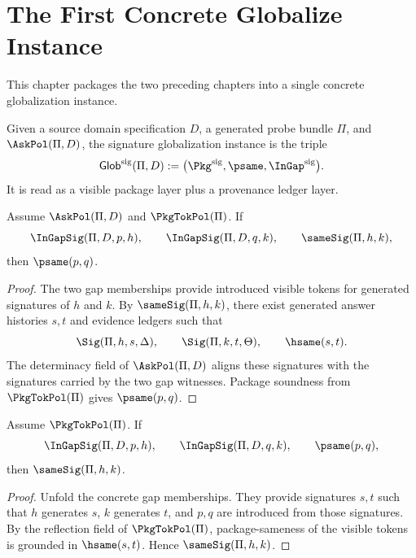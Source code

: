 \chapter{The First Concrete Globalize Instance}
\label{ch:concrete-instances-globalize}

This chapter packages the two preceding chapters into a single concrete globalization instance.

\begin{definition}
Given a source domain specification \(D\), a generated probe bundle \(\Pi\), and \(\AskPol(\Pi,D)\), the signature globalization instance is the triple
$$
  \mathsf{Glob}^{\mathrm{sig}}(\Pi,D)
  :=
  \bigl(\Pkg^{\mathrm{sig}},\psame,\InGap^{\mathrm{sig}}\bigr).
$$
It is read as a visible package layer plus a provenance ledger layer.
\end{definition}

\begin{theorem}
\label{thm:concrete-globalize-soundness}
Assume \(\AskPol(\Pi,D)\) and \(\PkgTokPol(\Pi)\). If
$$
  \InGapSig(\Pi,D,p,h),
  \qquad
  \InGapSig(\Pi,D,q,k),
  \qquad
  \sameSig(\Pi,h,k),
$$
then \(\psame(p,q)\).
\end{theorem}
\begin{proof}
The two gap memberships provide introduced visible tokens for generated signatures of \(h\) and \(k\). By \(\sameSig(\Pi,h,k)\), there exist generated answer histories \(s,t\) and evidence ledgers such that
$$
  \Sig(\Pi,h,s,\Delta),\qquad \Sig(\Pi,k,t,\Theta),\qquad \hsame(s,t).
$$
The determinacy field of \(\AskPol(\Pi,D)\) aligns these signatures with the signatures carried by the two gap witnesses. Package soundness from \(\PkgTokPol(\Pi)\) gives \(\psame(p,q)\).
\end{proof}

\begin{theorem}
\label{thm:concrete-globalization-completeness}
Assume \(\PkgTokPol(\Pi)\). If
$$
  \InGapSig(\Pi,D,p,h),
  \qquad
  \InGapSig(\Pi,D,q,k),
  \qquad
  \psame(p,q),
$$
then \(\sameSig(\Pi,h,k)\).
\end{theorem}
\begin{proof}
Unfold the concrete gap memberships. They provide signatures \(s,t\) such that \(h\) generates \(s\), \(k\) generates \(t\), and \(p,q\) are introduced from those signatures. By the reflection field of \(\PkgTokPol(\Pi)\), package-sameness of the visible tokens is grounded in \(\hsame(s,t)\). Hence \(\sameSig(\Pi,h,k)\).
\end{proof}

